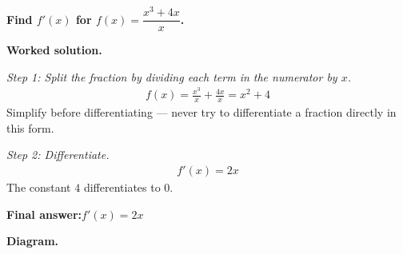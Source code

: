 \documentclass[11pt]{article}
\newcommand{\question}[1]{\par\medskip\noindent\textbf{#1}\par}
\begin{document}
\question{Find \( f'(x) \) for \( f(x) = \dfrac{x^3 + 4x}{x} \).}

\textbf{Worked solution.}

\textit{Step 1: Split the fraction by dividing each term in the numerator by \( x \).}
\[\begin{gathered}
f(x) = \frac{x^3}{x} + \frac{4x}{x} = x^2 + 4
\end{gathered}\]
Simplify before differentiating --- never try to differentiate a fraction directly in this form.

\textit{Step 2: Differentiate.}
\[\begin{gathered}
f'(x) = 2x
\end{gathered}\]
The constant \(4\) differentiates to \(0\).

\begin{answerbox}
\textbf{Final answer:}\quad \(\displaystyle  f'(x) = 2x \)
\end{answerbox}
\textbf{Diagram.}
\end{document}
